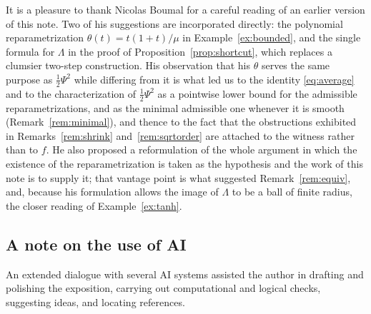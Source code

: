 \documentclass[11pt]{article}
\theoremstyle{plain}
\theoremstyle{definition}
\theoremstyle{remark}
\begin{document}
It is a pleasure to thank Nicolas Boumal for a careful reading of an earlier
version of this note. Two of his suggestions are incorporated directly: the
polynomial reparametrization $\theta(t)=t(1+t)/\mu$ in Example~\ref{ex:bounded},
and the single formula for $\Lambda$ in the proof of
Proposition~\ref{prop:shortcut}, which replaces a clumsier two-step construction.
His observation that his $\theta$ serves the same purpose as $\tfrac12\Psi^2$ while
differing from it is what led us to the identity \eqref{eq:average} and to the
characterization of $\tfrac12\Psi^2$ as a pointwise lower bound for the admissible
reparametrizations, and as the minimal admissible one whenever it is smooth
(Remark~\ref{rem:minimal}), and thence to the fact that the obstructions exhibited
in Remarks~\ref{rem:shrink} and~\ref{rem:sqrtorder} are attached to the witness
rather than to $f$. He also proposed a reformulation of the whole argument in which
the existence of the reparametrization is taken as the hypothesis and the work of
this note is to supply it; that vantage point is what suggested
Remark~\ref{rem:equiv}, and, because his formulation allows the image of $\Lambda$
to be a ball of finite radius, the closer reading of Example~\ref{ex:tanh}.

\subsection*{A note on the use of AI}

An extended dialogue with several AI systems assisted the author in drafting and polishing the exposition, carrying out computational and logical checks, suggesting ideas, and locating references.
\end{document}
